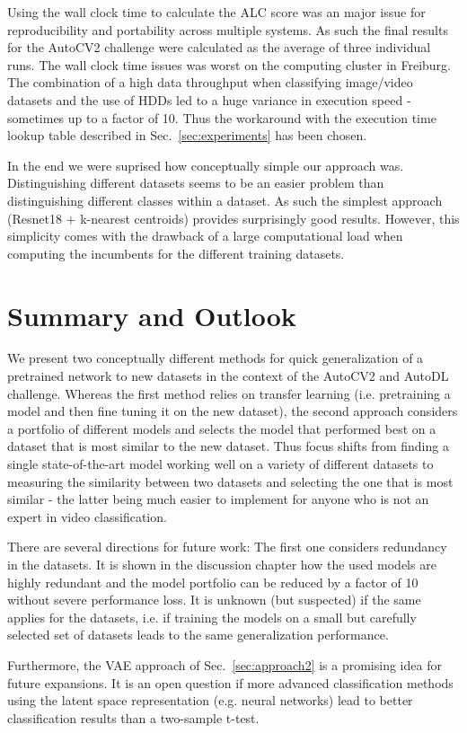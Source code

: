 \documentclass{article}
\begin{document}
Using the wall clock time to calculate the ALC score was an major issue for reproducibility and portability across multiple systems. As such the final results for the AutoCV2 challenge were calculated as the average of three individual runs. The wall clock time issues was worst on the computing cluster in Freiburg. The combination of a high data throughput when classifying image/video datasets and the use of HDDs led to a huge variance in execution speed - sometimes up to a factor of 10. Thus the workaround with the execution time lookup table described in Sec.~\ref{sec:experiments} has been chosen.

In the end we were suprised how conceptually simple our approach was. Distinguishing different datasets seems to be an easier problem than distinguishing different classes within a dataset. As such the simplest approach (Resnet18 +  k-nearest centroids) provides surprisingly good results. However, this simplicity comes with the drawback of a large computational load when computing the incumbents for the different training datasets.

\section{Summary and Outlook}
\label{sec:summary}

We present two conceptually different methods for quick generalization of a pretrained network to new datasets in the context of the AutoCV2 and AutoDL challenge. Whereas the first method relies on transfer learning (i.e. pretraining a model and then fine tuning it on the new dataset), the second approach considers a portfolio of different models and selects the model that performed best on a dataset that is most similar to the new dataset.
Thus focus shifts from finding a single state-of-the-art model working well on a variety of different datasets to measuring the similarity between two datasets and selecting the one that is most similar - the latter being much easier to implement for anyone who is not an expert in video classification. 

There are several directions for future work: The first one considers redundancy in the datasets. It is shown in the discussion chapter how the used models are highly redundant and the model portfolio can be reduced by a factor of 10 without severe performance loss. It is unknown (but suspected) if the same applies for the datasets, i.e. if training the models on a small but carefully selected set of datasets leads to the same generalization performance. 

Furthermore, the VAE approach of Sec.~\ref{sec:approach2} is a promising idea for future expansions. It is an open question if more advanced classification methods using the latent space representation (e.g. neural networks) lead to better classification results than a two-sample t-test. 



\end{document}
